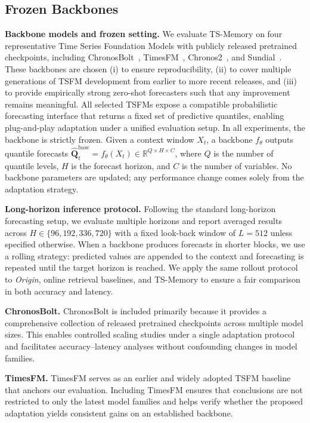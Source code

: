 \subsection{Frozen Backbones}
\noindent\textbf{Backbone models and frozen setting.}
We evaluate TS-Memory on four representative Time Series Foundation Models with publicly released pretrained checkpoints, including ChronosBolt~\cite{ansari2024chronos}, TimesFM~\cite{das2024decoder}, Chronos2~\cite{ansari2025chronos}, and Sundial~\cite{liu2025sundial}.
These backbones are chosen (i) to ensure reproducibility, (ii) to cover multiple generations of TSFM development from earlier to more recent releases, and (iii) to provide empirically strong zero-shot forecasters such that any improvement remains meaningful.
All selected TSFMs expose a compatible probabilistic forecasting interface that returns a fixed set of predictive quantiles, enabling plug-and-play adaptation under a unified evaluation setup.
In all experiments, the backbone is strictly frozen.
Given a context window $X_t$, a backbone $f_{\theta}$ outputs quantile forecasts
$\widehat{\mathbf{Q}}^{\text{base}}_{t}=f_{\theta}(X_t) \in \mathbb{R}^{Q \times H \times C}$,
where $Q$ is the number of quantile levels, $H$ is the forecast horizon, and $C$ is the number of variables.
No backbone parameters are updated; any performance change comes solely from the adaptation strategy.

\noindent\textbf{Long-horizon inference protocol.}
Following the standard long-horizon forecasting setup, we evaluate multiple horizons and report averaged results across $H \in \{96,192,336,720\}$ with a fixed look-back window of $L=512$ unless specified otherwise.
When a backbone produces forecasts in shorter blocks, we use a rolling strategy: predicted values are appended to the context and forecasting is repeated until the target horizon is reached.
We apply the same rollout protocol to \textit{Origin}, online retrieval baselines, and TS-Memory to ensure a fair comparison in both accuracy and latency.

\noindent\textbf{ChronosBolt.}
ChronosBolt is included primarily because it provides a comprehensive collection of released pretrained checkpoints across multiple model sizes.
This enables controlled scaling studies under a single adaptation protocol and facilitates accuracy--latency analyses without confounding changes in model families.

\noindent\textbf{TimesFM.}
TimesFM serves as an earlier and widely adopted TSFM baseline that anchors our evaluation.
Including TimesFM ensures that conclusions are not restricted to only the latest model families and helps verify whether the proposed adaptation yields consistent gains on an established backbone.

